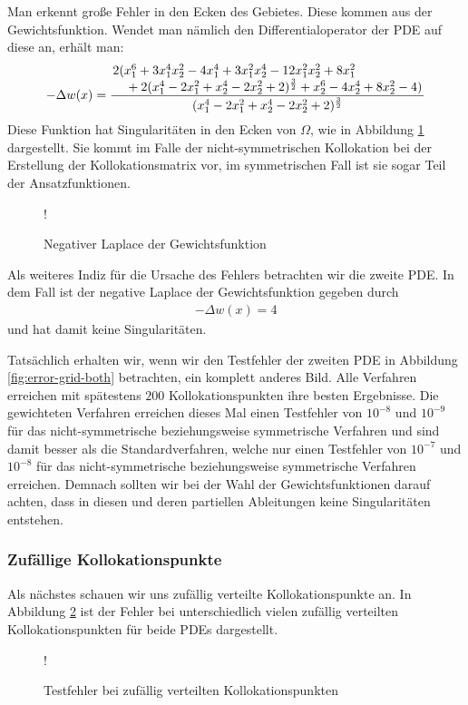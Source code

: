 Man erkennt große Fehler in den Ecken des Gebietes. Diese kommen aus der Gewichtsfunktion. Wendet man nämlich den Differentialoperator der \ac{PDE} auf diese an, erhält man:
\begin{align*}
-\Delta w(x) = \frac{\splitfrac{ 2(x_1^6+3x_1^4x_2^2-4x_1^4+3x_1^2x_2^4-12x_1^2x_2^2+8x_1^2}{+2(x_1^4-2x_1^2+x_2^4-2x_2^2+2)^{\frac{3}{2}}+x_2^6-4x_2^4+8x_2^2-4)}}{(x_1^4-2x_1^2+x_2^4-2x_2^2+2)^{\frac{3}{2}}}
\end{align*}
Diese Funktion hat Singularitäten in den Ecken von $\Omega$, wie in Abbildung \ref{fig:Gewicht} dargestellt. Sie kommt im Falle der nicht-symmetrischen Kollokation bei der Erstellung der Kollokationsmatrix vor, im symmetrischen Fall ist sie sogar Teil der Ansatzfunktionen.
\begin{figure}[ht]
\centering
\resizebox {\columnwidth} {!} {

}
\caption{Negativer Laplace der Gewichtsfunktion}
\label{fig:Gewicht}
\end{figure}
Als weiteres Indiz für die Ursache des Fehlers betrachten wir die zweite \ac{PDE}. In dem Fall ist der negative Laplace der Gewichtsfunktion gegeben durch
\begin{align*}
- \Delta w(x) = 4
\end{align*}
und hat damit keine Singularitäten.

Tatsächlich erhalten wir, wenn wir den Testfehler der zweiten \ac{PDE} in Abbildung \ref{fig:error-grid-both} betrachten, ein komplett anderes Bild. Alle Verfahren erreichen mit spätestens $200$ Kollokationspunkten ihre besten Ergebnisse. Die gewichteten Verfahren erreichen dieses Mal einen Testfehler von $10^{-8}$ und $10^{-9}$ für das nicht-symmetrische beziehungsweise symmetrische Verfahren und sind damit besser als die Standardverfahren, welche nur einen Testfehler von $10^{-7}$ und $10^{-8}$ für das nicht-symmetrische beziehungsweise symmetrische Verfahren erreichen. Demnach sollten wir bei der Wahl der Gewichtsfunktionen darauf achten, dass in diesen und deren partiellen Ableitungen keine Singularitäten entstehen.

\subsubsection{Zufällige Kollokationspunkte}
Als nächstes schauen wir uns zufällig verteilte Kollokationspunkte an. In Abbildung \ref{fig:error-random} ist der Fehler bei unterschiedlich vielen zufällig verteilten Kollokationspunkten für beide \acp{PDE} dargestellt.
\begin{figure}[ht]
\centering
\resizebox {\columnwidth} {!} {

}
\caption{Testfehler bei zufällig verteilten Kollokationspunkten}
\label{fig:error-random}
\end{figure}

